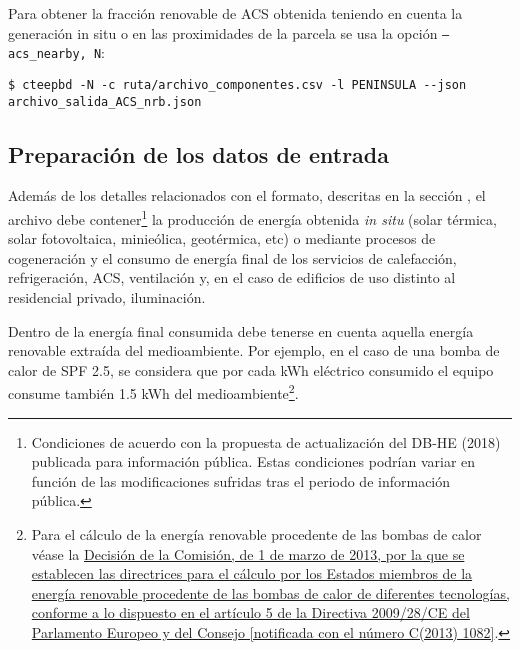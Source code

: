 \documentclass[10pt,notitlepage,oneside,a4paper]{article}
\begin{document}
Para obtener la fracción renovable de ACS obtenida teniendo en cuenta la generación in situ o en las proximidades de la parcela se usa la opción \texttt{--acs\_nearby, N}:

\begin{Verbatim}[fontsize=\small]
    $ cteepbd -N -c ruta/archivo_componentes.csv -l PENINSULA --json archivo_salida_ACS_nrb.json
\end{Verbatim}

\subsection{Preparación de los datos de entrada}

Además de los detalles relacionados con el formato, descritas en la sección \textit{}, el archivo debe contener\footnote{Condiciones de acuerdo con la propuesta de actualización del DB-HE (2018) publicada para información pública. Estas condiciones podrían variar en función de las modificaciones sufridas tras el periodo de información pública.} la producción de energía obtenida \textit{in situ} (solar térmica, solar fotovoltaica, minieólica, geotérmica, etc) o mediante procesos de cogeneración y el consumo de energía final de los servicios de calefacción, refrigeración, ACS, ventilación y, en el caso de edificios de uso distinto al residencial privado, iluminación.

Dentro de la energía final consumida debe tenerse en cuenta aquella energía renovable extraída del medioambiente. Por ejemplo, en el caso de una bomba de calor de SPF 2.5, se considera que por cada kWh eléctrico consumido el equipo consume también 1.5 kWh del medioambiente\footnote{Para el cálculo de la energía renovable procedente de las bombas de calor véase la \href{https://www.boe.es/doue/2013/062/L00027-00035.pdf}{Decisión de la Comisión, de 1 de marzo de 2013, por la que se establecen las directrices para el cálculo por los Estados miembros de la energía renovable procedente de las bombas de calor de diferentes tecnologías, conforme a lo dispuesto en el artículo 5 de la Directiva 2009/28/CE del Parlamento Europeo y del Consejo [notificada con el número C(2013) 1082]}.}.
\end{document}

